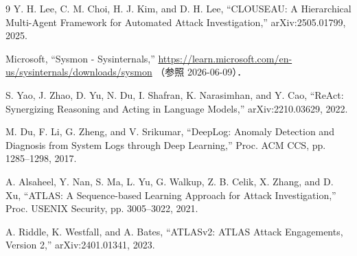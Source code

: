 ﻿

\begin{thebibliography}{9}
Y. H. Lee, C. M. Choi, H. J. Kim, and D. H. Lee,
``CLOUSEAU: A Hierarchical Multi-Agent Framework for Automated Attack Investigation,''
arXiv:2505.01799, 2025.

Microsoft,
``Sysmon - Sysinternals,''
\url{https://learn.microsoft.com/en-us/sysinternals/downloads/sysmon}
（参照 2026-06-09）．

S. Yao, J. Zhao, D. Yu, N. Du, I. Shafran, K. Narasimhan, and Y. Cao,
``ReAct: Synergizing Reasoning and Acting in Language Models,''
arXiv:2210.03629, 2022.

M. Du, F. Li, G. Zheng, and V. Srikumar,
``DeepLog: Anomaly Detection and Diagnosis from System Logs through Deep Learning,''
Proc. ACM CCS, pp. 1285--1298, 2017.

A. Alsaheel, Y. Nan, S. Ma, L. Yu, G. Walkup, Z. B. Celik, X. Zhang, and D. Xu,
``ATLAS: A Sequence-based Learning Approach for Attack Investigation,''
Proc. USENIX Security, pp. 3005--3022, 2021.

A. Riddle, K. Westfall, and A. Bates,
``ATLASv2: ATLAS Attack Engagements, Version 2,''
arXiv:2401.01341, 2023.
\end{thebibliography}


